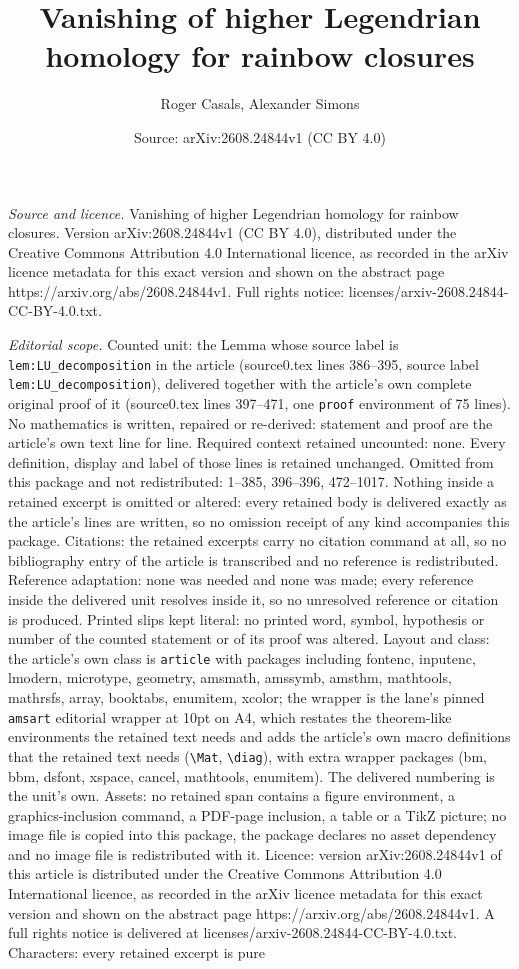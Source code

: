 \documentclass[10pt,a4paper]{amsart}
\title[Vanishing of higher Legendrian homology for rainbow closures]{Vanishing of higher Legendrian homology for rainbow closures}
\author{Roger Casals, Alexander Simons}
\date{Source: arXiv:2608.24844v1 (CC BY 4.0)}
\begin{document}
\maketitle

\noindent\emph{Source and licence.} Vanishing of higher Legendrian homology for rainbow closures. Version arXiv:2608.24844v1 (CC BY 4.0), distributed under the Creative Commons Attribution 4.0 International licence, as recorded in the arXiv licence metadata for this exact version and shown on the abstract page https://arxiv.org/abs/2608.24844v1. Full rights notice: licenses/arxiv-2608.24844-CC-BY-4.0.txt.\par\smallskip

\noindent\textit{Editorial scope.} Counted unit: the Lemma whose source label is \texttt{lem:LU\_decomposition} in the article (source0.tex lines 386--395, source label \texttt{lem:LU\_decomposition}), delivered together with the article's own complete original proof of it (source0.tex lines 397--471, one \texttt{proof} environment of 75 lines). No mathematics is written, repaired or re-derived: statement and proof are the article's own text line for line. Required context retained uncounted: none. Every definition, display and label of those lines is retained unchanged. Omitted from this package and not redistributed: 1--385, 396--396, 472--1017. Nothing inside a retained excerpt is omitted or altered: every retained body is delivered exactly as the article's lines are written, so no omission receipt of any kind accompanies this package. Citations: the retained excerpts carry no citation command at all, so no bibliography entry of the article is transcribed and no reference is redistributed. Reference adaptation: none was needed and none was made; every reference inside the delivered unit resolves inside it, so no unresolved reference or citation is produced. Printed slips kept literal: no printed word, symbol, hypothesis or number of the counted statement or of its proof was altered. Layout and class: the article's own class is \texttt{article} with packages including fontenc, inputenc, lmodern, microtype, geometry, amsmath, amssymb, amsthm, mathtools, mathrsfs, array, booktabs, enumitem, xcolor; the wrapper is the lane's pinned \texttt{amsart} editorial wrapper at 10pt on A4, which restates the theorem-like environments the retained text needs and adds the article's own macro definitions that the retained text needs (\texttt{\textbackslash Mat}, \texttt{\textbackslash diag}), with extra wrapper packages (bm, bbm, dsfont, xspace, cancel, mathtools, enumitem). The delivered numbering is the unit's own. Assets: no retained span contains a figure environment, a graphics-inclusion command, a PDF-page inclusion, a table or a TikZ picture; no image file is copied into this package, the package declares no asset dependency and no image file is redistributed with it. Licence: version arXiv:2608.24844v1 of this article is distributed under the Creative Commons Attribution 4.0 International licence, as recorded in the arXiv licence metadata for this exact version and shown on the abstract page https://arxiv.org/abs/2608.24844v1. A full rights notice is delivered at licenses/arxiv-2608.24844-CC-BY-4.0.txt. Characters: every retained excerpt is pure 
\end{document}
